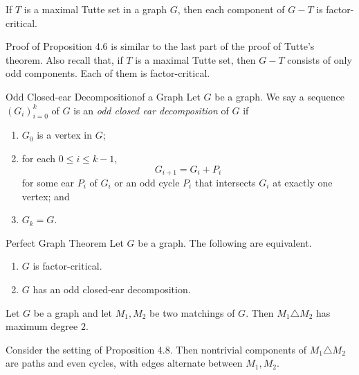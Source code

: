 \documentclass[co342]{subfiles}
\begin{document}
    \begin{prop}{}
        If $T$ is a maximal Tutte set in a graph $G$, then each component of $G-T$ is factor-critical.
    \end{prop}

    \begin{subproof}
        Proof of Proposition 4.6 is similar to the last part of the proof of Tutte's theorem. Also recall that, if $T$ is a maximal Tutte set, then $G-T$ consists of only odd components. Each of them is factor-critical.
    \end{subproof}

    \begin{definition}{Odd Closed-ear Decomposition}{of a Graph}
        Let $G$ be a graph. We say a sequence $\left( G_{i} \right)^{k}_{i=0}$ of $G$ is an \emph{odd closed ear decomposition} of $G$ if 
        \begin{enumerate}
            \item $G_0$ is a vertex in $G$;
            \item for each $0\leq i\leq k-1$,
                \begin{equation*}
                    G_{i+1} = G_i+P_i
                \end{equation*}
                for some ear $P_i$ of $G_i$ or an odd cycle $P_i$ that intersects $G_i$ at exactly one vertex; and
            \item $G_k=G$.
        \end{enumerate}
    \end{definition}

    \begin{theorem}{Perfect Graph Theorem}
        Let $G$ be a graph. The following are equivalent.
        \begin{enumerate}
            \item $G$ is factor-critical.
            \item $G$ has an odd closed-ear decomposition.
        \end{enumerate}
    \end{theorem}

    \begin{prop}{}
        Let $G$ be a graph and let $M_1,M_2$ be two matchings of $G$. Then $M_1\triangle M_2$ has maximum degree $2$.
    \end{prop}

    \begin{cor}{}
        Consider the setting of Proposition 4.8. Then nontrivial components of $M_1\triangle M_2$ are paths and even cycles, with edges alternate between $M_1,M_2$.
    \end{cor}	
\end{document}

